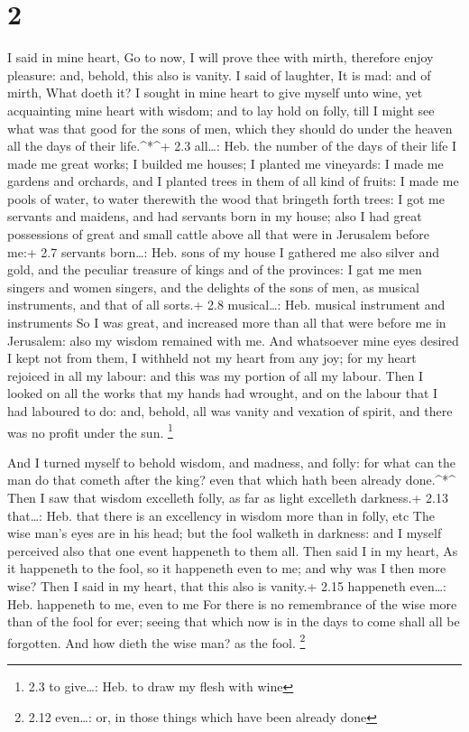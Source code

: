 \hypertarget{section-1}{%
\section{2}\label{section-1}}

 I said in mine heart, Go to now, I will prove thee with
mirth, therefore enjoy pleasure: and, behold, this also is vanity.
 I said of laughter, It is mad: and of mirth, What doeth it?
 I sought in mine heart to give myself unto wine, yet
acquainting mine heart with wisdom; and to lay hold on folly, till I
might see what was that good for the sons of men, which they should do
under the heaven all the days of their life.\^{}*\^{}+ 2.3 all\ldots:
Heb. the number of the days of their life  I made me great
works; I builded me houses; I planted me vineyards:  I made
me gardens and orchards, and I planted trees in them of all kind of
fruits:  I made me pools of water, to water therewith the
wood that bringeth forth trees:  I got me servants and
maidens, and had servants born in my house; also I had great possessions
of great and small cattle above all that were in Jerusalem before me:+
2.7 servants born\ldots: Heb. sons of my house  I gathered
me also silver and gold, and the peculiar treasure of kings and of the
provinces: I gat me men singers and women singers, and the delights of
the sons of men, as musical instruments, and that of all sorts.+ 2.8
musical\ldots: Heb. musical instrument and instruments  So I
was great, and increased more than all that were before me in Jerusalem:
also my wisdom remained with me.  And whatsoever mine eyes
desired I kept not from them, I withheld not my heart from any joy; for
my heart rejoiced in all my labour: and this was my portion of all my
labour.  Then I looked on all the works that my hands had
wrought, and on the labour that I had laboured to do: and, behold, all
was vanity and vexation of spirit, and there was no profit under the
sun. \footnote{2.3 to give\ldots: Heb. to draw my flesh with wine}

 And I turned myself to behold wisdom, and madness, and
folly: for what can the man do that cometh after the king? even that
which hath been already done.\^{}*\^{}  Then I saw that
wisdom excelleth folly, as far as light excelleth darkness.+ 2.13
that\ldots: Heb. that there is an excellency in wisdom more than in
folly, etc  The wise man's eyes are in his head; but the
fool walketh in darkness: and I myself perceived also that one event
happeneth to them all.  Then said I in my heart, As it
happeneth to the fool, so it happeneth even to me; and why was I then
more wise? Then I said in my heart, that this also is vanity.+ 2.15
happeneth even\ldots: Heb. happeneth to me, even to me  For
there is no remembrance of the wise more than of the fool for ever;
seeing that which now is in the days to come shall all be forgotten. And
how dieth the wise man? as the fool. \footnote{2.12 even\ldots: or, in
  those things which have been already done}

